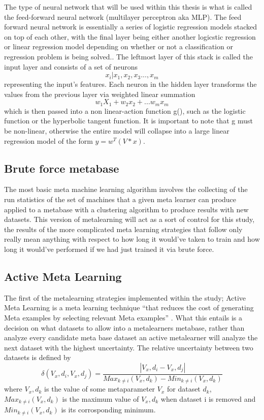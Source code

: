 \documentclass[a4paper,11pt]{article}
\begin{document}
The type of neural network that will be used within this thesis is
what is called the feed-forward neural network (multilayer perceptron
aka MLP). The feed forward neural network is essentially a series of
logistic regression models stacked on top of each other, with the
final layer being either another logicstic regression or linear
regression model depending on whether or not a classification or
regression problem is being solved.\cite{Murphy}. The leftmost
layer of this stack is called the input layer and consists of a set of
neurons $${x_i|x_1,x_2,x_3...,x_m}$$ representing the input's
features. Each neuron in the hidden layer transforms the values from
the previous layer via weighted linear summation $$w_1X_1 + w_2x_2 +...w_mx_m$$ \cite{Scikit}
which is then passed into a non linear-action function g(), such as the logistic function or
the hyperbolic tangent function. It is important to note that g must be non-linear, otherwise
the entire model will collapse into a large linear regression model of
the form $y = w^T(V*x)$. \cite{Murphy}

\subsection{Brute force metabase}
The most basic meta machine learning algorithm involves the collecting of the run statistics
of the set of machines that a given meta learner can produce applied to a metabase with a clustering
algorithm to produce results with new datasets. This version of metalearning will act as a sort of control
for this study, the results of the more complicated meta learning strategies that follow only really mean
anything with respect to how long it would've taken to train and how long it would've performed if we had
just trained it via brute force.

\subsection{Active Meta Learning}
The first of the metalearning strategies implemented within the study; Active
Meta Learning is a meta learning technique  ``that reduces the cost of generating Meta examples
by selecting relevant Meta examples'' \cite{Bhatt}. What this entails is a decision on what
datasets to allow into a metalearners metabase, rather than analyze every candidate meta base dataset
an active metalearner will analyze the next dataset with the highest uncertainty. The relative uncertainty
between two datasets is defined by
$$\delta(V_x,d_i,V_x,d_j) = \frac{|V_x,d_i - V_x,d_j|}{Max_{k\neq i}(V_x,d_k)- Min_{k\neq i}(V_x,d_k)}$$
where $V_x,d_k$ is the value of some metaparameter $V_x$ for dataset $d_k$,
$Max_{k\neq i}(V_x,d_k)$ is the maximum value of $V_x,d_k$ when dataset i is removed and
$Min_{k\neq i}(V_x,d_k)$ is its corrosponding minimum.
\end{document}
